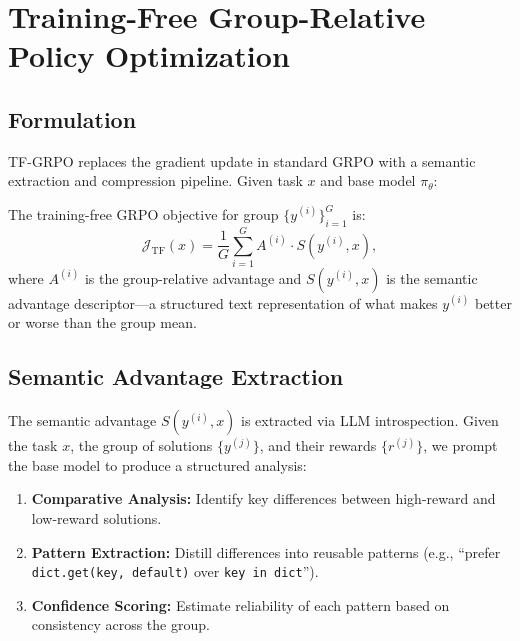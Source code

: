 \section{Training-Free Group-Relative Policy Optimization}

\label{sec:tfgrpo}

\subsection{Formulation}

TF-GRPO replaces the gradient update in standard GRPO with a semantic
extraction and compression pipeline. Given task $x$ and base model $\pi_\theta$:

\begin{definition}
The training-free GRPO objective for group $\{y^{(i)}\}_{i=1}^G$ is:
\begin{equation}
    \mathcal{J}_{\text{TF}}(x) = \frac{1}{G} \sum_{i=1}^{G} A^{(i)} \cdot S(y^{(i)}, x),
\end{equation}
where $A^{(i)}$ is the group-relative advantage and $S(y^{(i)}, x)$ is the
semantic advantage descriptor---a structured text representation of what makes
$y^{(i)}$ better or worse than the group mean.
\end{definition}

\subsection{Semantic Advantage Extraction}

The semantic advantage $S(y^{(i)}, x)$ is extracted via LLM introspection.
Given the task $x$, the group of solutions $\{y^{(j)}\}$, and their rewards
$\{r^{(j)}\}$, we prompt the base model to produce a structured analysis:

\begin{enumerate}[leftmargin=1.5em]
    \item \textbf{Comparative Analysis:} Identify key differences between
          high-reward and low-reward solutions.
    \item \textbf{Pattern Extraction:} Distill differences into reusable
          patterns (e.g., ``prefer \texttt{dict.get(key, default)} over
          \texttt{key in dict}'').
    \item \textbf{Confidence Scoring:} Estimate reliability of each pattern
          based on consistency across the group.
\end{enumerate}

